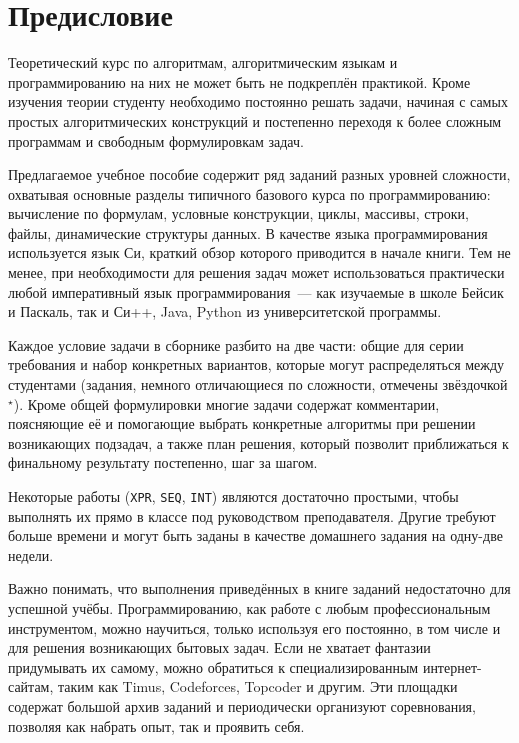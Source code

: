 \chapter{Предисловие}

Теоретический курс по алгоритмам, алгоритмическим языкам и программированию на них не может быть не
подкреплён практикой. Кроме изучения теории студенту необходимо постоянно решать задачи, начиная с
самых простых алгоритмических конструкций и постепенно переходя к более сложным программам
и свободным формулировкам задач.

Предлагаемое учебное пособие содержит ряд заданий разных уровней сложности, охватывая основные
разделы типичного базового курса по программированию: вычисление по формулам, условные конструкции,
циклы, массивы, строки, файлы, динамические структуры данных. В качестве языка программирования
используется язык Си, краткий обзор которого приводится в начале книги. Тем не менее, при
необходимости для решения задач может использоваться практически любой императивный язык
программирования~--- как изучаемые в школе Бейсик и Паскаль, так и Си++, Java, Python из
университетской программы.

Каждое условие задачи в сборнике разбито на две части: общие для серии требования и набор конкретных вариантов,
которые могут распределяться между студентами (задания, немного отличающиеся по сложности, отмечены
звёздочкой$^\star$). Кроме общей формулировки многие задачи содержат комментарии, поясняющие её и
помогающие выбрать конкретные алгоритмы при решении возникающих подзадач, а также план решения,
который позволит приближаться к финальному результату постепенно, шаг за шагом.

Некоторые работы (\texttt{XPR}, \texttt{SEQ}, \texttt{INT}) являются достаточно простыми, чтобы
выполнять их прямо в классе под руководством преподавателя. Другие требуют больше времени и могут
быть заданы в качестве домашнего задания на одну-две недели.

Важно понимать, что выполнения приведённых в книге заданий недостаточно для успешной учёбы.
Программированию, как работе с любым профессиональным инструментом, можно научиться, только
используя его постоянно, в том числе и для решения возникающих бытовых задач. Если не хватает
фантазии придумывать их самому, можно обратиться к специализированным интернет-сайтам, таким как
Timus, Codeforces, Topcoder и другим. Эти площадки содержат большой архив заданий и периодически
организуют соревнования, позволяя как набрать опыт, так и проявить себя.

